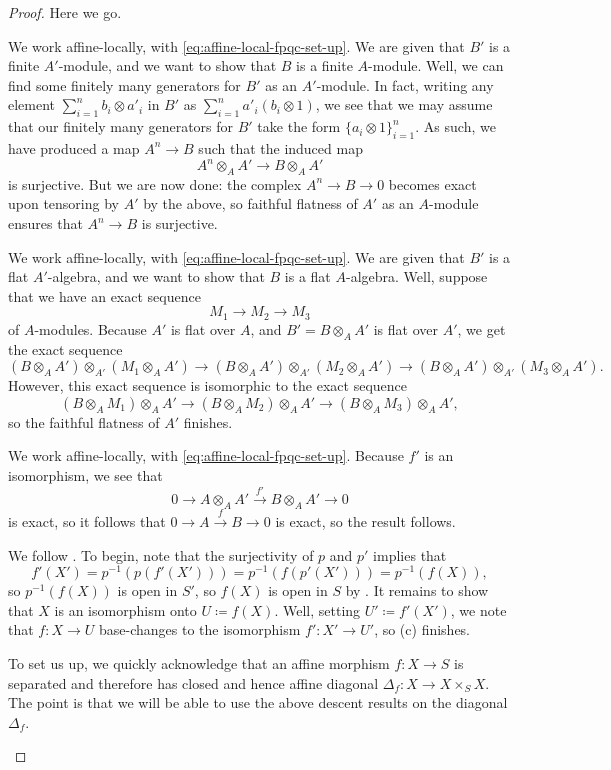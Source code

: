 \documentclass{amsart}
\begin{document}
\begin{proof}
    Here we go.
    \begin{listalph}
        \item We work affine-locally, with \eqref{eq:affine-local-fpqc-set-up}. We are given that $B'$ is a finite $A'$-module, and we want to show that $B$ is a finite $A$-module. Well, we can find some finitely many generators for $B'$ as an $A'$-module. In fact, writing any element $\sum_{i=1}^nb_i\otimes a'_i$ in $B'$ as $\sum_{i=1}^na'_i(b_i\otimes1)$, we see that we may assume that our finitely many generators for $B'$ take the form $\{a_i\otimes1\}_{i=1}^n$. As such, we have produced a map $A^n\to B$ such that the induced map
        \[A^n\otimes_AA'\to B\otimes_AA'\]
        is surjective. But we are now done: the complex $A^n\to B\to0$ becomes exact upon tensoring by $A'$ by the above, so faithful flatness of $A'$ as an $A$-module ensures that $A^n\to B$ is surjective.
        \item We work affine-locally, with \eqref{eq:affine-local-fpqc-set-up}. We are given that $B'$ is a flat $A'$-algebra, and we want to show that $B$ is a flat $A$-algebra. Well, suppose that we have an exact sequence
        \[M_1\to M_2\to M_3\]
        of $A$-modules. Because $A'$ is flat over $A$, and $B'=B\otimes_AA'$ is flat over $A'$, we get the exact sequence
        \[(B\otimes_AA')\otimes_{A'}(M_1\otimes_AA')\to(B\otimes_AA')\otimes_{A'}(M_2\otimes_AA')\to(B\otimes_AA')\otimes_{A'}(M_3\otimes_AA').\]
        However, this exact sequence is isomorphic to the exact sequence
        \[(B\otimes_AM_1)\otimes_AA'\to(B\otimes_AM_2)\otimes_AA'\to(B\otimes_AM_3)\otimes_AA',\]
        so the faithful flatness of $A'$ finishes.
        \item We work affine-locally, with \eqref{eq:affine-local-fpqc-set-up}. Because $f'$ is an isomorphism, we see that
        \[0\to A\otimes_AA'\stackrel{f'}\to B\otimes_AA'\to0\]
        is exact, so it follows that $0\to A\stackrel f\to B\to0$ is exact, so the result follows.
        \item We follow \cite{emerton-descent}. To begin, note that the surjectivity of $p$ and $p'$ implies that
        \[f'(X')=p^{-1}(p(f'(X')))=p^{-1}(f(p'(X')))=p^{-1}(f(X)),\]
        so $p^{-1}(f(X))$ is open in $S'$, so $f(X)$ is open in $S$ by . It remains to show that $X$ is an isomorphism onto $U\coloneqq f(X)$. Well, setting $U'\coloneqq f'(X')$, we note that $f\colon X\to U$ base-changes to the isomorphism $f'\colon X'\to U'$, so (c) finishes.
        \item To set us up, we quickly acknowledge that an affine morphism $f\colon X\to S$ is separated and therefore has closed and hence affine diagonal $\Delta_f\colon X\to X\times_SX$. The point is that we will be able to use the above descent results on the diagonal $\Delta_f$.


\end{listalph}
\end{proof}
\end{document}
